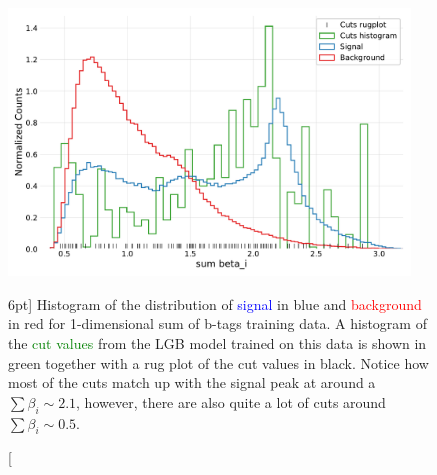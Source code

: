 \documentclass[a4paper, twoside]{tufte-book}
\begin{document}
\begin{figure}
  \includegraphics[width=0.95\textwidth, trim=10 10 10 20, clip]{figures/quarks/gtag_sum_method_njet=4-down_sample=1.00-ML_vars=vertex-selection=b-ejet_min=4-n_iter_RS_lgb=99-n_iter_RS_xgb=9-cdot_cut=0.90-version=19.pdf}
  \caption[1D Sum Model Cuts for 4-jets][6pt]
          {Histogram of the distribution of \textcolor{blue}{signal} in blue and \textcolor{red}{background} in red for 1-dimensional sum of b-tags training data. A histogram of the \textcolor{green}{cut values} from the LGB model trained on this data is shown in green together with a rug plot of the cut values in black. Notice how most of the cuts match up with the signal peak at around a $\sum \beta_i \sim 2.1$, however, there are also quite a lot of cuts around $\sum \beta_i \sim 0.5$.
          } 
  \label{fig:q:1d_sum_model_cuts_4j}
\end{figure}
\end{document}
